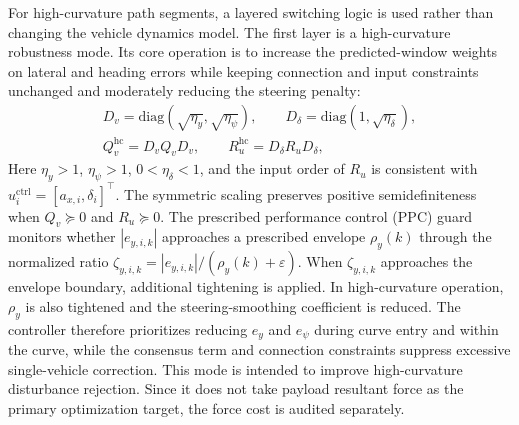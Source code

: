 \documentclass[twocolumn,3p,times,procedia]{elsarticle}
\begin{document}
For high-curvature path segments, a layered switching logic is used rather than changing the vehicle dynamics model. The first layer is a high-curvature robustness mode. Its core operation is to increase the predicted-window weights on lateral and heading errors while keeping connection and input constraints unchanged and moderately reducing the steering penalty:
\begin{equation}
\begin{gathered}
D_v=\mathrm{diag}(\sqrt{\eta_y},\sqrt{\eta_\psi}),\qquad
D_\delta=\mathrm{diag}(1,\sqrt{\eta_\delta}),\\
Q_v^{\mathrm{hc}}=D_v Q_v D_v,\qquad
R_u^{\mathrm{hc}}=D_\delta R_u D_\delta ,
\end{gathered}
\label{eq:high_curvature_lateral_priority}
\end{equation}
Here $\eta_y>1$, $\eta_\psi>1$, $0<\eta_\delta<1$, and the input order of $R_u$ is consistent with $u_i^{\mathrm{ctrl}}=[a_{x,i},\delta_i]^\top$. The symmetric scaling preserves positive semidefiniteness when $Q_v\succeq0$ and $R_u\succeq0$. The prescribed performance control (PPC) guard monitors whether $|e_{y,i,k}|$ approaches a prescribed envelope $\rho_y(k)$ through the normalized ratio $\zeta_{y,i,k}=|e_{y,i,k}|/(\rho_y(k)+\varepsilon)$. When $\zeta_{y,i,k}$ approaches the envelope boundary, additional tightening is applied. In high-curvature operation, $\rho_y$ is also tightened and the steering-smoothing coefficient is reduced. The controller therefore prioritizes reducing $e_y$ and $e_\psi$ during curve entry and within the curve, while the consensus term and connection constraints suppress excessive single-vehicle correction. This mode is intended to improve high-curvature disturbance rejection. Since it does not take payload resultant force as the primary optimization target, the force cost is audited separately.
\end{document}

